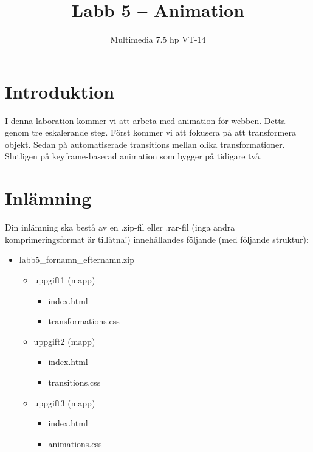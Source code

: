 \documentclass[12pt]{article}
\date{}
\title{ Labb 5 -- Animation }
\author{ Multimedia 7.5 hp VT-14 }
\begin{document}
\maketitle
\vspace{-3.5em}




\section{Introduktion}
I denna laboration kommer vi att arbeta med animation för webben. Detta genom tre eskalerande steg. Först kommer vi att fokusera på att transformera objekt. Sedan på automatiserade transitions mellan olika transformationer. Slutligen på keyframe-baserad animation som bygger på tidigare två.

\section{Inlämning}
Din inlämning ska bestå av en .zip-fil eller .rar-fil (inga andra komprimeringsformat är tillåtna!) innehållandes följande (med följande struktur):
  \begin{itemize}
    \item labb5\_fornamn\_efternamn.zip
      \vspace{-0.5em}
      \begin{itemize}
        \item uppgift1 (mapp)
          \begin{itemize}
            \item index.html
            \item transformations.css
          \end{itemize}
        \item uppgift2 (mapp)
          \begin{itemize}
            \item index.html
            \item transitions.css
          \end{itemize}
        \item uppgift3 (mapp)
          \begin{itemize}
            \item index.html
            \item animations.css
          \end{itemize}
    \end{itemize}
  \end{itemize}
\end{document}
